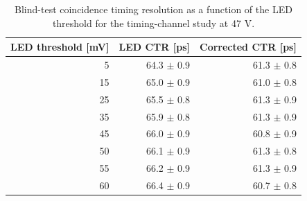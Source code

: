\begin{table}[htbp]
\centering
\small
\begin{tabular}{rrr}
\toprule
LED threshold [mV] & LED CTR [ps] & Corrected CTR [ps] \\
\midrule
5 & 64.3 $\pm$ 0.9 & 61.3 $\pm$ 0.8 \\
15 & 65.0 $\pm$ 0.9 & 61.0 $\pm$ 0.8 \\
25 & 65.5 $\pm$ 0.8 & 61.3 $\pm$ 0.9 \\
35 & 65.9 $\pm$ 0.8 & 61.3 $\pm$ 0.9 \\
45 & 66.0 $\pm$ 0.9 & 60.8 $\pm$ 0.9 \\
50 & 66.1 $\pm$ 0.9 & 61.3 $\pm$ 0.8 \\
55 & 66.2 $\pm$ 0.9 & 61.3 $\pm$ 0.9 \\
60 & 66.4 $\pm$ 0.9 & 60.7 $\pm$ 0.8 \\
\bottomrule
\end{tabular}
\caption{Blind-test coincidence timing resolution as a function of the LED threshold for the timing-channel study at 47 V.}
\label{tab:fbk-timing-threshold-scan}
\end{table}
